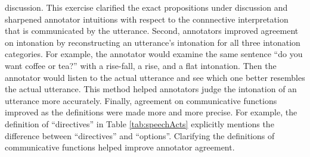 \documentclass[oneside]{report}
\theoremstyle{definition}
\theoremstyle{definition}
\theoremstyle{definition}
\theoremstyle{remark}
\begin{document}
discussion. This exercise clarified the exact propositions under
discussion and sharpened annotator intuitions with respect to the
connnective interpretation that is communicated by the utterance.
Second, annotators improved agreement on intonation by reconstructing an
utterance's intonation for all three intonation categories. For example,
the annotator would examine the same sentence ``do you want coffee or
tea?'' with a rise-fall, a rise, and a flat intonation. Then the
annotator would listen to the actual utterance and see which one better
resembles the actual utterance. This method helped annotators judge the
intonation of an utterance more accurately. Finally, agreement on
communicative functions improved as the definitions were made more and
more precise. For example, the definition of ``directives'' in Table
\ref{tab:speechActs} explicitly mentions the difference between
``directives'' and ``options''. Clarifying the definitions of
communicative functions helped improve annotator agreement.
\end{document}
